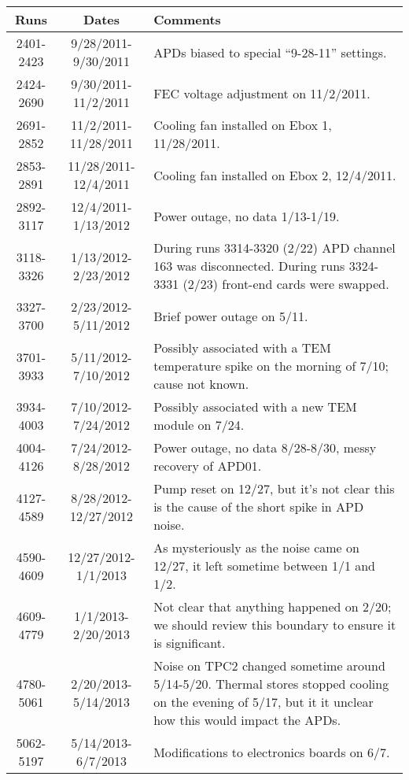 \begin{table}\label{tab:NoiseTimeWindows}
\begin{singlespace}
\begin{center}
\begin{tabular}{|c|c|p{}|}\hline
Runs & Dates & Comments \\\hline
2401-2423 & 9/28/2011-9/30/2011 & APDs biased to special ``9-28-11'' settings. \\\hline
2424-2690 & 9/30/2011-11/2/2011 & FEC voltage adjustment on 11/2/2011. \\\hline %
2691-2852 & 11/2/2011-11/28/2011 & Cooling fan installed on Ebox 1, 11/28/2011. \\\hline
2853-2891 & 11/28/2011-12/4/2011 & Cooling fan installed on Ebox 2, 12/4/2011. \\\hline
2892-3117 & 12/4/2011-1/13/2012 & Power outage, no data 1/13-1/19. \\\hline
3118-3326 & 1/13/2012-2/23/2012 & During runs 3314-3320 (2/22) APD channel 163 was disconnected.  During runs 3324-3331 (2/23) front-end cards were swapped.\\\hline
3327-3700 & 2/23/2012-5/11/2012 & Brief power outage on 5/11. \\\hline
3701-3933 & 5/11/2012-7/10/2012 & Possibly associated with a TEM temperature spike on the morning of 7/10; cause not known. \\\hline
3934-4003 & 7/10/2012-7/24/2012 & Possibly associated with a new TEM module on 7/24. \\\hline
4004-4126 & 7/24/2012-8/28/2012 & Power outage, no data 8/28-8/30, messy recovery of APD01. \\\hline
4127-4589 & 8/28/2012-12/27/2012 & Pump reset on 12/27, but it's not clear this is the cause of the short spike in APD noise. \\\hline
4590-4609 & 12/27/2012-1/1/2013 & As mysteriously as the noise came on 12/27, it left sometime between 1/1 and 1/2. \\\hline
4609-4779 & 1/1/2013-2/20/2013 & Not clear that anything happened on 2/20; we should review this boundary to ensure it is significant. \\\hline
4780-5061 & 2/20/2013-5/14/2013 & Noise on TPC2 changed sometime around 5/14-5/20.  Thermal stores stopped cooling on the evening of 5/17, but it it unclear how this would impact the APDs. \\\hline
5062-5197 & 5/14/2013-6/7/2013 & Modifications to electronics boards on 6/7. \\\hline

\end{tabular}
\end{center}
\end{singlespace}
\end{table}
